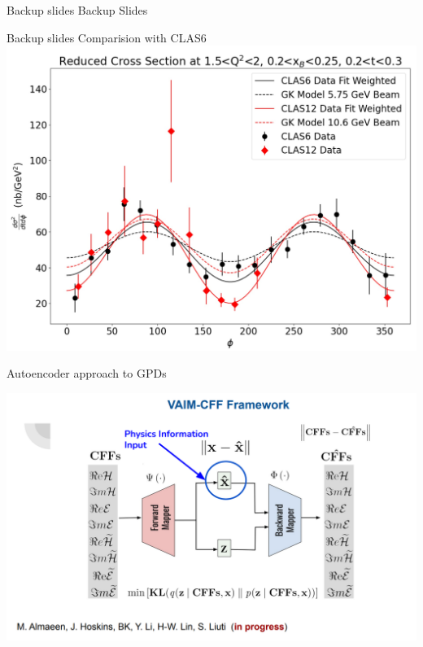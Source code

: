 \documentclass[aspectratio=169]{beamer}
\begin{document}
\begin{frame}{Backup slides}
Backup Slides

\end{frame}




\begin{frame}{Backup slides}
\centering
Comparision with CLAS6\\

    \includegraphics[scale=0.2832]{DNP/comp_c12_gk_c6.jpg}\\
\end{frame}



\begin{frame}{Autoencoder approach to GPDs}

  \includegraphics[scale=0.52832]{janres/vain1.png}
\end{frame}
\end{document}
